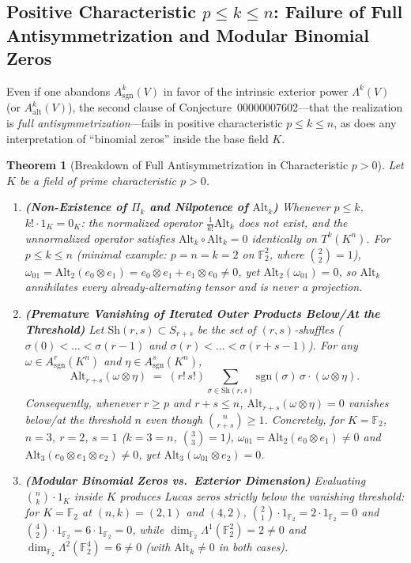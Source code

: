 \documentclass[11pt,a4paper]{article}
\newtheorem{theorem}{Theorem}[section]
\theoremstyle{definition}
\theoremstyle{remark}
\newcommand{\Alt}{\mathrm{Alt}}
\newcommand{\Sh}{\mathrm{Sh}}
\newcommand{\sgn}{\mathrm{sgn}}
\newcommand{\F}{\mathbb{F}}
\begin{document}
\subsection{Positive Characteristic \texorpdfstring{$p \le k \le n$}{p <= k <= n}: Failure of Full Antisymmetrization and Modular Binomial Zeros}

Even if one abandons $A^k_{\sgn}(V)$ in favor of the intrinsic exterior power $\Lambda^k(V)$ (or $A^k_{\mathrm{alt}}(V)$), the second clause of Conjecture~00000007602---that the realization is \emph{full antisymmetrization}---fails in positive characteristic $p \le k \le n$, as does any interpretation of ``binomial zeros'' inside the base field $K$.

\begin{theorem}[Breakdown of Full Antisymmetrization in Characteristic $p > 0$]\label{thm:charp-realization}
Let $K$ be a field of prime characteristic $p > 0$.
\begin{enumerate}
\item[(a)] \textbf{(Non-Existence of $\Pi_k$ and Nilpotence of $\Alt_k$)} Whenever $p \le k$, $k! \cdot 1_K = 0_K$: the normalized operator $\frac{1}{k!}\Alt_k$ does not exist, and the unnormalized operator satisfies $\Alt_k \circ \Alt_k = 0$ identically on $T^k(K^n)$. For $p \le k \le n$ (minimal example: $p = n = k = 2$ on $\F_2^2$, where $\binom{2}{2} = 1$), $\omega_{01} = \Alt_2(e_0 \otimes e_1) = e_0 \otimes e_1 + e_1 \otimes e_0 \neq 0$, yet $\Alt_2(\omega_{01}) = 0$, so $\Alt_k$ annihilates every already-alternating tensor and is never a projection.
\item[(b)] \textbf{(Premature Vanishing of Iterated Outer Products Below/At the Threshold)} Let $\Sh(r, s) \subset S_{r+s}$ be the set of $(r,s)$-shuffles ($\sigma(0) < \dots < \sigma(r-1)$ and $\sigma(r) < \dots < \sigma(r+s-1)$). For any $\omega \in A^r_{\sgn}(K^n)$ and $\eta \in A^s_{\sgn}(K^n)$,
\begin{equation}\label{eq:shuffle-factor}
  \Alt_{r+s}(\omega \otimes \eta) \;=\; (r!\,s!) \sum_{\sigma \in \Sh(r,s)} \sgn(\sigma)\,\sigma \cdot (\omega \otimes \eta).
\end{equation}
Consequently, whenever $r \ge p$ and $r + s \le n$, $\Alt_{r+s}(\omega \otimes \eta) = 0$ vanishes \emph{below/at} the threshold $n$ even though $\binom{n}{r+s} \ge 1$. Concretely, for $K = \F_2$, $n = 3$, $r = 2$, $s = 1$ ($k = 3 = n$, $\binom{3}{3} = 1$), $\omega_{01} = \Alt_2(e_0 \otimes e_1) \neq 0$ and $\Alt_3(e_0 \otimes e_1 \otimes e_2) \neq 0$, yet $\Alt_3(\omega_{01} \otimes e_2) = 0$.
\item[(c)] \textbf{(Modular Binomial Zeros vs.\ Exterior Dimension)} Evaluating $\binom{n}{k} \cdot 1_K$ inside $K$ produces Lucas zeros strictly below the vanishing threshold: for $K = \F_2$ at $(n, k) = (2, 1)$ and $(4, 2)$, $\binom{2}{1} \cdot 1_{\F_2} = 2 \cdot 1_{\F_2} = 0$ and $\binom{4}{2} \cdot 1_{\F_2} = 6 \cdot 1_{\F_2} = 0$, while $\dim_{\F_2} \Lambda^1(\F_2^2) = 2 \neq 0$ and $\dim_{\F_2} \Lambda^2(\F_2^4) = 6 \neq 0$ (with $\Alt_k \neq 0$ in both cases).
\end{enumerate}
\end{theorem}
\end{document}
